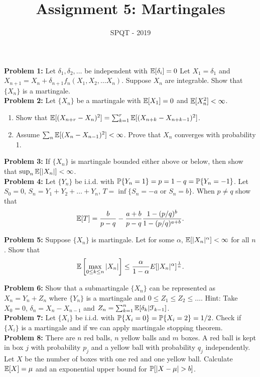 \documentclass[a4paper,11pt,english]{article}
\title{Assignment 5: Martingales}
\author{SPQT - 2019}
\begin{document}
\maketitle
\textbf{Problem 1:} Let $\delta_1, \delta_2,\dots$ be independent with $\E[\delta_i] = 0$ Let $X_1 = \delta_1$ and $X_{n+1} = X_n + \delta_{n+1} f_n(X_1,X_2,\dots X_n)$. Suppose $X_n$ are integrable. Show that $\{X_n\}$ is a martingale. \\

\indent \textbf{Problem 2:} Let $\{X_n\}$ be a martingale with $\E[X_1] = 0$ and $\E[X_n^2] < \infty$.
\begin{enumerate}
\item Show that $\E[(X_{n+r} - X_n)^2] = \sum_{k=1}^r \E[(X_{n+k} - X_{n+k-1})^2]$.
\item Assume $\sum_n \E[(X_n - X_{n-1})^2] < \infty$. Prove that $X_n$ converges with probability 1.
\end{enumerate} 

\indent \textbf{Problem 3:} If $\{X_n\}$ is martingale bounded either above or below, then show that $\sup_n \E[|X_n|] < \infty$.\\

\indent \textbf{Problem 4:} Let $\{Y_n\}$ be i.i.d. with $\P\{Y_n = 1\} = p = 1-q = \P\{Y_n = -1\}$. Let $S_0 =0$, $S_n = Y_1+Y_2+\dots +Y_n$, $T = \inf\{S_n = -a$ or $S_n = b\}$. When $p \neq q$ show that 
\begin{align*}
\E[T] = \frac{b}{p-q} - \frac{a+b}{p-q} \frac{1-(p/q)^b}{1-(p/q)^{a+b}}.
\end{align*}

\indent \textbf{Problem 5:} Suppose $\{X_n\}$ is martingale. Let for some $\alpha$, $\E[|X_n|^\alpha] < \infty$ for all $n$. Show that 
\begin{align*}
\E \left[\max_{0\leq k \leq n} |X_n|\right] \leq \frac{\alpha}{1-\alpha} E[|X_n|^\alpha]^{\frac{1}{\alpha}}.
\end{align*}

\indent \textbf{Problem 6:} Show that a submartingale $\{X_n\}$ can be represented as $X_n = Y_n + Z_n$ where $\{Y_n\}$ is a martingale and $0 \leq Z_1 \leq Z_2 \leq \dots$. Hint: Take $X_0 = 0$, $\delta_n = X_n - X_{n-1}$ and $Z_n = \sum_{k=1}^n \E[\delta_k|\mathcal{F}_{k-1}]$. \\

\indent \textbf{Problem 7:}  Let $\{X_i\}$ be i.i.d. with $\P\{X_i = 0\} = \P\{X_i = 2\} = 1/2$. Check if $\{X_i\}$ is a martingale and if we can apply martingale stopping theorem. \\

\indent \textbf{Problem 8:} There are $n$ red balls, $n$ yellow balls and $m$ boxes. A red ball is kept in box $j$ with probability $p_j$ and a yellow ball with probability $q_j$ independently. Let $X$ be the number of boxes with one red and one yellow ball. Calculate $\E[X] = \mu $ and an exponential upper bound for $\P[|X-\mu|>b]$.
 
\end{document}
